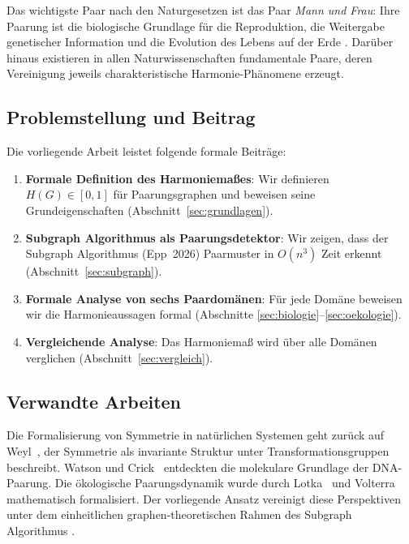﻿\documentclass[a4paper,12pt]{article}
\theoremstyle{definition}
\begin{document}
Das wichtigste Paar nach den Naturgesetzen ist das Paar \emph{Mann und Frau}: Ihre
Paarung ist die biologische Grundlage für die Reproduktion, die Weitergabe genetischer
Information und die Evolution des Lebens auf der Erde \cite{darwin1859,mayr1963}.
Darüber hinaus existieren in allen Naturwissenschaften fundamentale Paare, deren Vereinigung
jeweils charakteristische Harmonie-Phänomene erzeugt.

\subsection{Problemstellung und Beitrag}

Die vorliegende Arbeit leistet folgende formale Beiträge:

\begin{enumerate}
	\item \textbf{Formale Definition des Harmoniemaßes}: Wir definieren $H(G) \in [0,1]$
	für Paarungsgraphen und beweisen seine Grundeigenschaften (Abschnitt~\ref{sec:grundlagen}).
	
	\item \textbf{Subgraph Algorithmus als Paarungsdetektor}: Wir zeigen, dass der
	Subgraph Algorithmus (Epp~2026) Paarmuster in $O(n^3)$ Zeit erkennt
	(Abschnitt~\ref{sec:subgraph}).
	
	\item \textbf{Formale Analyse von sechs Paardomänen}: Für jede Domäne beweisen wir
	die Harmonieaussagen formal (Abschnitte \ref{sec:biologie}--\ref{sec:oekologie}).
	
	\item \textbf{Vergleichende Analyse}: Das Harmoniemaß wird über alle Domänen
	verglichen (Abschnitt~\ref{sec:vergleich}).
\end{enumerate}

\subsection{Verwandte Arbeiten}

Die Formalisierung von Symmetrie in natürlichen Systemen geht zurück auf Weyl~\cite{weyl1952},
der Symmetrie als invariante Struktur unter Transformationsgruppen beschreibt.
Watson und Crick~\cite{watson1953} entdeckten die molekulare Grundlage der DNA-Paarung.
Die ökologische Paarungsdynamik wurde durch Lotka~\cite{lotka1925} und
Volterra~\cite{volterra1926} mathematisch formalisiert. Der vorliegende Ansatz
vereinigt diese Perspektiven unter dem einheitlichen graphen-theoretischen Rahmen des
Subgraph Algorithmus \cite{epp2026}.
\end{document}
